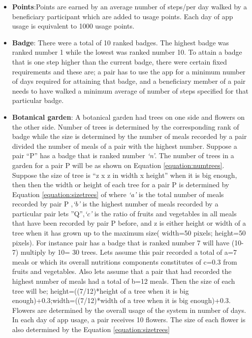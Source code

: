 \documentclass{sig-alternate}
\begin{document}
\begin{itemize}
\item{\textbf{Points}}:Points are earned by an average number of steps/per day walked by a beneficiary participant which are added to usage points. Each day of app usage is equivalent to 1000 usage points.
\item{\textbf{Badge}}: There were a total of 10 ranked badges. The highest badge was ranked number 1 while the lowest was ranked number 10. To attain a badge that is one step higher than the current badge, there were certain fixed requirements and these are; a pair has to use the app for a minimum number of days required for attaining that badge, and a beneficiary member of a pair needs to have walked a minimum average of number of steps specified for that particular badge. 
\item{\textbf{Botanical garden}}: A botanical garden had trees on one side and flowers on the other side. Number of trees is determined by the corresponding rank of badge while the size is determined by the number of meals recorded by a pair divided the number of meals of a pair with the highest number. Suppose a pair ``P'' has a badge that is ranked number \emph{`n'}.  The number of trees in a garden for a pair P will be as shown on Equation \ref{equation:numtrees}. Suppose the size of tree is ``z x z in width x height'' when it is big enough, then then the width or height of each tree for a pair P is determined by Equation \ref{equation:sizetrees} of where \emph{`a'} is the total number of meals recorded by pair P ,\emph{`b'} is the highest number of meals recorded by a particular pair lets ''Q'',\emph{`c'} is the ratio of fruits and vegetables in all meals that have been recorded by pair P before, and z is either height or width of a tree when it has grown up to the maximum size( width=50 pixels; height=50 pixels).   For instance pair has a badge that is ranked number 7 will have (10-7) multiply by 10= 30 trees. Lets assume this pair recorded a total of a=7 meals or which its overall nutritions components constitutes of c=0.3 from fruits and vegetables. Also lets assume that a pair that had recorded the highest number of meals had a total of b=12 meals. Then the size of each tree will be; height=((7/12)*height of a tree when it is big enough)+0.3;width=((7/12)*width of a tree when it is big enough)+0.3.  Flowers are determined by the overall usage of the system in number of days. In each day of app usage, a pair receives 10 flowers. The size of each flower is also determined by the Equation \ref{equation:sizetrees}

\end{itemize}
\end{document}

